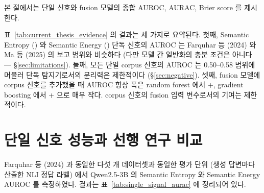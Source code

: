 \documentclass[oneside,ko,under]{snuthesis}
\begin{document}
본 절에서는 단일 신호와 fusion 모델의 종합 AUROC, AURAC, Brier score 를 제시한다.



표~\ref{tab:current_thesis_evidence} 의 결과는 세 가지로 요약된다. 첫째, Semantic Entropy (\HeadlineSEAuroc{}) 와 Semantic Energy (\HeadlineEnergyAuroc{}) 단독 신호의 AUROC 는 Farquhar 등 (2024) 와 Ma 등 (2025) 의 보고 범위와 비슷하다 (다만 모델 간 일반화의 충분 조건은 아니다 — §\ref{sec:limitations}). 둘째, 모든 단일 corpus 신호의 AUROC 는 0.50--0.58 범위에 머물러 단독 탐지기로서의 분리력은 제한적이다 (§\ref{sec:negative}). 셋째, fusion 모델에 corpus 신호를 추가했을 때 AUROC 향상 폭은 random forest 에서 +\HeadlineCorpusLiftRF{}, gradient boosting 에서 +\HeadlineCorpusLiftGBM{} 으로 매우 작다. corpus 신호의 fusion 입력 변수로서의 기여는 제한적이다.


\section{단일 신호 성능과 선행 연구 비교}\label{sec:single_signal}

Farquhar 등 (2024) 과 동일한 다섯 개 데이터셋과 동일한 평가 단위 (생성 답변마다 산출한 NLI 정답 라벨) 에서 Qwen2.5-3B 의 Semantic Entropy 와 Semantic Energy AUROC 를 측정하였다. 결과는 표~\ref{tab:single_signal_aurac} 에 정리되어 있다.

\begin{table}[htbp]
\centering
\small
\caption[단일 신호 성능과 선행 연구 비교]{단일 신호의 AUROC 와 AURAC. 모든 신호는 신호 점수의 순위만으로 평가하며 별도 학습은 적용하지 않는다. 마지막 열은 Semantic Entropy 와 Semantic Energy 원 논문이 다른 모델에서 보고한 AUROC 범위이다.}
\label{tab:single_signal_aurac}
\end{table}
\end{document}
